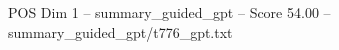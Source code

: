 \begin{textsample}{POS Dim 1 – summary\_guided\_gpt – Score 54.00 – summary\_guided\_gpt/t776\_gpt.txt}
\end{textsample}
